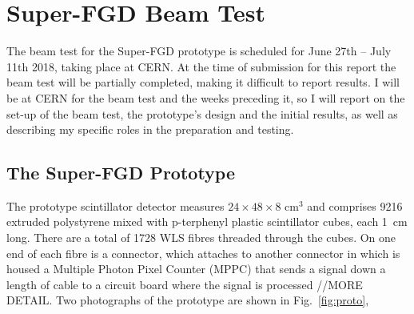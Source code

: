 \documentclass[aps,pra,12pt,notitlepage,tightenlines]{revtex4-1}
\begin{document}
\section{Super-FGD Beam Test}
The beam test for the Super-FGD prototype is scheduled for June 27th -- July 11th 2018, taking place at CERN. At the time of submission for this report the beam test will be partially completed, making it difficult to report results. I will be at CERN for the beam test and the weeks preceding it, so I will report on the set-up of the beam test, the prototype's design and the initial results, as well as describing my specific roles in the preparation and testing.

\subsection{The Super-FGD Prototype}
The prototype scintillator detector measures $24\times48\times8$ cm$^3$ and comprises 9216 extruded polystyrene mixed with p-terphenyl plastic scintillator cubes, each 1~cm long. There are a total of 1728 WLS fibres threaded through the cubes. On one end of each fibre is a connector, which attaches to another connector in which is housed a Multiple Photon Pixel Counter (MPPC) that sends a signal down a length of cable to a circuit board where the signal is processed //MORE DETAIL. Two photographs of the prototype are shown in Fig.\ \ref{fig:proto},
\end{document}
